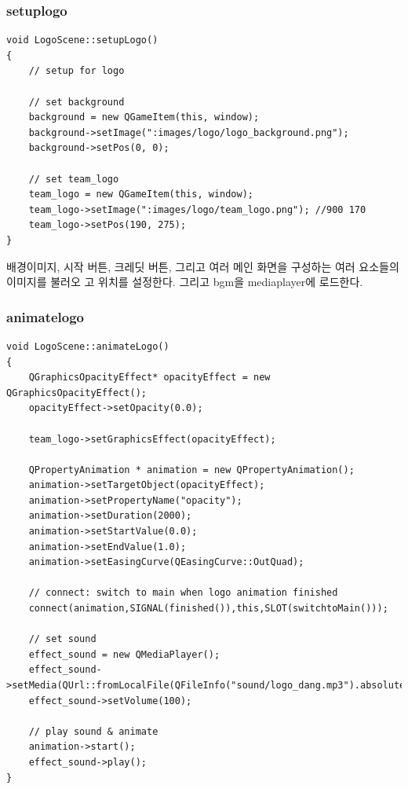 \documentclass[10pt,oneside,a4paper,titlepage]{article}
\begin{document}
\subsubsection{setuplogo}

\begin{lstlisting}
void LogoScene::setupLogo()
{
    // setup for logo

    // set background
    background = new QGameItem(this, window);
    background->setImage(":images/logo/logo_background.png");
    background->setPos(0, 0);

    // set team_logo
    team_logo = new QGameItem(this, window);
    team_logo->setImage(":images/logo/team_logo.png"); //900 170
    team_logo->setPos(190, 275);
}

\end{lstlisting}

배경이미지, 시작 버튼, 크레딧 버튼, 그리고 여러 메인 화면을 구성하는 여러 요소들의 이미지를 불러오
고 위치를 설정한다. 그리고 bgm을 mediaplayer에 로드한다.

\subsubsection{animatelogo}

\begin{lstlisting}
void LogoScene::animateLogo()
{
    QGraphicsOpacityEffect* opacityEffect = new QGraphicsOpacityEffect();
    opacityEffect->setOpacity(0.0);

    team_logo->setGraphicsEffect(opacityEffect);

    QPropertyAnimation * animation = new QPropertyAnimation();
    animation->setTargetObject(opacityEffect);
    animation->setPropertyName("opacity");
    animation->setDuration(2000);
    animation->setStartValue(0.0);
    animation->setEndValue(1.0);
    animation->setEasingCurve(QEasingCurve::OutQuad);

    // connect: switch to main when logo animation finished
    connect(animation,SIGNAL(finished()),this,SLOT(switchtoMain()));

    // set sound
    effect_sound = new QMediaPlayer();
    effect_sound->setMedia(QUrl::fromLocalFile(QFileInfo("sound/logo_dang.mp3").absoluteFilePath()));
    effect_sound->setVolume(100);
    
    // play sound & animate    
    animation->start();
    effect_sound->play();
}

\end{lstlisting}
\end{document}
